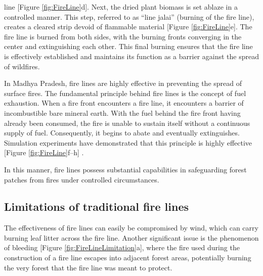 \documentclass[
  12 pt,
]{Nemilov}
\begin{document}
line {[}Figure \ref{fig:FireLine}d{]}. Next, the dried plant biomass is set ablaze in a controlled manner. This step, referred to as ``line jalai'' (burning of the fire line), creates a cleared strip devoid of flammable material {[}Figure \ref{fig:FireLine}e{]}. The fire line is burned from both sides, with the burning fronts converging in the center and extinguishing each other. This final burning ensures that the fire line is effectively established and maintains its function as a barrier against the spread of wildfires.

In Madhya Pradesh, fire lines are highly effective in preventing the spread of surface fires. The fundamental principle behind fire lines is the concept of fuel exhaustion. When a fire front encounters a fire line, it encounters a barrier of incombustible bare mineral earth. With the fuel behind the fire front having already been consumed, the fire is unable to sustain itself without a continuous supply of fuel. Consequently, it begins to abate and eventually extinguishes. Simulation experiments have demonstrated that this principle is highly effective {[}Figure \ref{fig:FireLine}f--h{]} \citep{ankur2017fire}.

In this manner, fire lines possess substantial capabilities in safeguarding forest patches from fires under controlled circumstances.

\subsection{Limitations of traditional fire lines}\label{limitations-of-traditional-fire-lines}

The effectiveness of fire lines can easily be compromised by wind, which can carry burning leaf litter across the fire line. Another significant issue is the phenomenon of bleeding {[}Figure \ref{fig:FireLineLimitation}a{]}, where the fire used during the construction of a fire line escapes into adjacent forest areas, potentially burning the very forest that the fire line was meant to protect.
\end{document}
